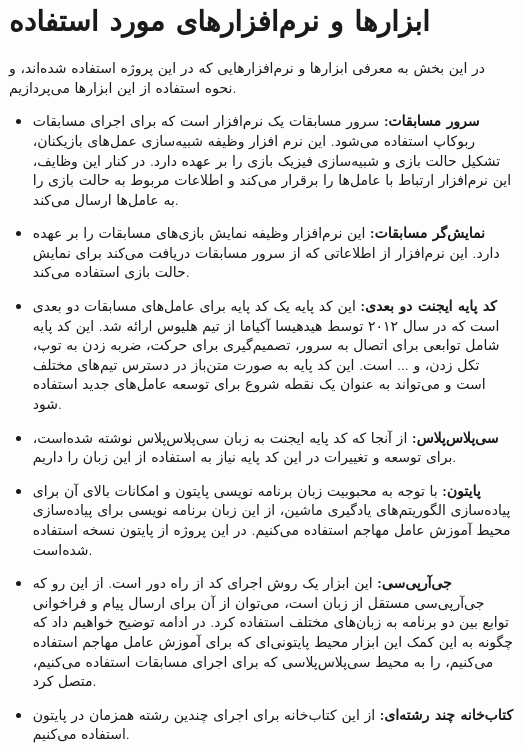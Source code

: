 \section{ابزار‌ها و نرم‌افزار‌های مورد استفاده}
در این بخش به معرفی ابزار‌ها و نرم‌افزار‌هایی که در این پروژه استفاده شده‌اند، و نحوه استفاده از این ابزار‌ها می‌پردازیم.
\begin{itemize}
    \item \textbf{سرور مسابقات:}
    سرور مسابقات یک نرم‌افزار است که برای اجرای مسابقات ربوکاپ استفاده می‌شود.
    این نرم افزار وظیفه شبیه‌سازی عمل‌های بازیکنان، تشکیل حالت بازی و شبیه‌سازی فیزیک بازی را بر عهده دارد.
    در کنار این وظایف، این نرم‌افزار ارتباط با عامل‌ها را برقرار می‌کند و اطلاعات مربوط به حالت بازی را به عامل‌ها ارسال می‌کند.
    \item \textbf{نمایش‌گر مسابقات:}
    این نرم‌افزار وظیفه نمایش بازی‌های مسابقات را بر عهده دارد.
    این نرم‌افزار از اطلاعاتی که از سرور مسابقات دریافت می‌کند برای نمایش حالت بازی استفاده می‌کند.
    \item \textbf{کد پایه ایجنت دو بعدی:}
    این کد پایه یک کد پایه برای عامل‌های مسابقات دو بعدی است که در سال ۲۰۱۲ توسط هیدهیسا آکیاما از تیم هلیوس ارائه شد\cite{akiyama2014helios}.
    این کد پایه شامل توابعی برای اتصال به سرور، تصمیم‌گیری برای حرکت، ضربه زدن به توپ، تکل زدن، و ... است.
    این کد پایه به صورت متن‌باز در دسترس تیم‌های مختلف است و می‌تواند به عنوان یک نقطه شروع برای توسعه عامل‌های جدید استفاده شود.
    \item \textbf{سی‌پلاس‌پلاس:}
    از آنجا که کد پایه ایجنت به زبان سی‌پلاس‌پلاس نوشته شده‌است، برای توسعه و تغییرات در این کد پایه نیاز به استفاده از این زبان را داریم.
    \item \textbf{پایتون:} 
    با توجه به محبوبیت زبان برنامه نویسی پایتون و امکانات بالای آن برای پیاده‌سازی الگوریتم‌های یادگیری ماشین، از این زبان برنامه نویسی برای پیاده‌سازی محیط آموزش عامل مهاجم استفاده می‌کنیم.
    در این پروژه از پایتون نسخه  استفاده شده‌است.
    \item \textbf{جی‌آر‌پی‌سی:}
    این ابزار یک روش اجرای کد از راه دور است. از این رو که جی‌آر‌پی‌سی مستقل از زبان است، می‌توان از آن برای ارسال پیام و فراخوانی توابع بین دو برنامه به زبان‌های مختلف استفاده کرد.
    در ادامه توضیح خواهیم داد که چگونه به این کمک این ابزار محیط پایتونی‌ای که برای آموزش عامل مهاجم استفاده می‌کنیم، را به محیط سی‌پلاس‌پلاسی که برای اجرای مسابقات استفاده می‌کنیم، متصل کرد.
    \item \textbf{کتاب‌خانه چند رشته‌ای:}
    از این کتاب‌خانه برای اجرای چندین رشته همزمان در پایتون استفاده می‌کنیم.

\end{itemize}
